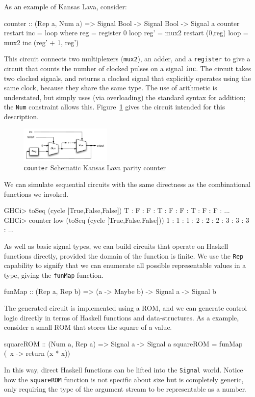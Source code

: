 \documentclass[11pt]{article}
\begin{document}
As an example of Kansas Lava, consider:

\begin{Code}

counter :: (Rep a, Num a) => Signal Bool -> Signal Bool -> Signal a
counter restart inc = loop
   where reg = register 0 loop
	 reg' = mux2 restart (0,reg)
	 loop = mux2 inc (reg' + 1, reg')
\end{Code}

This circuit connects two multiplexers (\verb|mux2|),
an adder,
and a \verb|register|
to give a circuit that counts the number of
clocked pulses on a signal \verb|inc|.
The circuit takes two clocked signals,
and returns a clocked signal that explicitly
operates using the same clock, because they
share the same type.
The use of arithmetic is understated,
but simply uses (via overloading) the
standard syntax for addition; the {\tt Num}
constraint allows this.
Figure~\ref{fig:counter-picture} gives the
circuit intended for this description.

\begin{figure}[!t]
  \centering         
    \includegraphics[width=0.4\textwidth]{images/Counter.pdf}
  \caption{{\tt counter} Schematic Kansas Lava parity counter}
  \label{fig:counter-picture}
\end{figure}


We can simulate sequential circuits with the
same directness as the combinational functions we invoked.
\begin{Code}
GHCi> toSeq (cycle [True,False,False])
T : F : F : T : F : F : T : F : F : ...
GHCi> counter low (toSeq (cycle [True,False,False]))
1 : 1 : 1 : 2 : 2 : 2 : 3 : 3 : 3 : ...
\end{Code}

As well as basic signal types,
we can build circuits that operate on Haskell
functions directly, provided the domain of the
function is finite. We use the \verb|Rep|
capability to signify that we can enumerate
all possible representable values in a type,
giving the \verb|funMap| function.
\begin{Code}
funMap :: (Rep a, Rep b) => (a -> Maybe b) -> Signal a -> Signal b
\end{Code}
The generated circuit is implemented using a ROM,
and we can generate control logic
directly in terms of Haskell functions
and data-structures. As a example, consider
a small ROM that stores the square of a
value.
\begin{Code}
squareROM :: (Num a, Rep a) => Signal a -> Signal a
squareROM = funMap (\ x -> return (x * x))
\end{Code}
In this way, direct Haskell functions
can be lifted into the \verb|Signal| world.
Notice how the \verb|squareROM| function is
not specific about size but is
completely generic, only requiring the
type of the argument stream
to be representable as a number.
\end{document}
